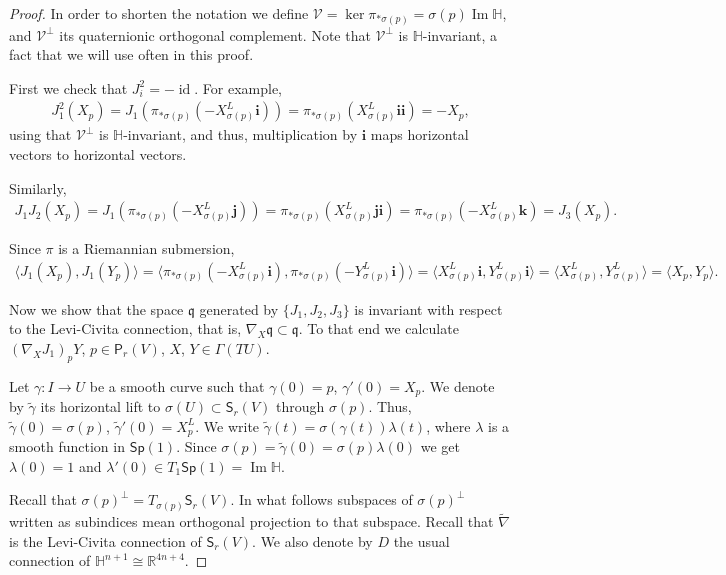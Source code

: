 \documentclass[12pt, a4paper]{amsart}
\newcommand{\id}{\operatorname{id}}
\newcommand{\g}{\mathfrak}
\newcommand{\R}{\mathbb{R}}
\renewcommand{\H}{\mathbb{H}}
\renewcommand{\Im}{\operatorname{Im}}
\newcommand{\Sp}{\mathsf{Sp}}
\theoremstyle{remark}
\begin{document}
\begin{proof}
In order to shorten the notation we define $\mathcal{V}=\ker\pi_{*\sigma(p)}=\sigma(p)\Im\H$, and $\mathcal{V}^\perp$ its quaternionic orthogonal complement.
Note that ${\mathcal{V}}^\perp$ is $\H$-invariant, a fact that we will use often in this proof.

First we check that $J_i^2=-\id$.
For example, 
\[
\begin{aligned}
J_1^2(X_p)
=J_1(\pi_{*\sigma(p)}(-X_{\sigma(p)}^L\mathbf{i}))
=\pi_{*\sigma(p)}(X_{\sigma(p)}^L\mathbf{i}\mathbf{i})
=-X_p,
\end{aligned}
\]
using that $\mathcal{V}^\perp$ is $\H$-invariant, and thus, multiplication by $\mathbf{i}$ maps horizontal vectors to horizontal vectors.

Similarly,
\[
\begin{aligned}
J_1 J_2(X_p)
=J_1(\pi_{*\sigma(p)}(-X_{\sigma(p)}^L\mathbf{j}))
=\pi_{*\sigma(p)}(X_{\sigma(p)}^L\mathbf{j}\mathbf{i})
=\pi_{*\sigma(p)}(-X_{\sigma(p)}^L\mathbf{k})
=J_3(X_p).
\end{aligned}
\]

Since $\pi$ is a Riemannian submersion,
\[
\begin{aligned}
\langle J_1(X_p),J_1(Y_p)\rangle
=\langle \pi_{*\sigma(p)}(-X_{\sigma(p)}^L\mathbf{i}),\pi_{*\sigma(p)}(-Y_{\sigma(p)}^L\mathbf{i})\rangle
=\langle X_{\sigma(p)}^L\mathbf{i}, Y_{\sigma(p)}^L\mathbf{i}\rangle
=\langle X_{\sigma(p)}^L, Y_{\sigma(p)}^L\rangle
=\langle X_p,Y_p\rangle.
\end{aligned}
\]

Now we show that the space $\g{q}$ generated by $\{J_1,J_2,J_3\}$ is invariant with respect to the Levi-Civita connection, that is, $\nabla_X\g{q}\subset\g{q}$.
To that end we calculate $(\nabla_X J_1)_p Y$, $p\in \mathsf{P}_r(V)$, $X$, $Y\in\Gamma(TU)$.

Let $\gamma\colon I\to U$ be a smooth curve such that $\gamma(0)=p$, $\gamma'(0)=X_p$.
We denote by $\tilde{\gamma}$ its horizontal lift to $\sigma(U)\subset\mathsf{S}_r(V)$ through $\sigma(p)$.
Thus, $\tilde{\gamma}(0)=\sigma(p)$, $\tilde{\gamma}'(0)=X_p^L$.
We write $\tilde{\gamma}(t)=\sigma(\gamma(t))\lambda(t)$, where $\lambda$ is a smooth function in $\Sp(1)$.
Since $\sigma(p)=\tilde{\gamma}(0)=\sigma(p)\lambda(0)$ we get $\lambda(0)=1$ and $\lambda'(0)\in T_1\Sp(1)=\Im\H$.

Recall that $\sigma(p)^\perp=T_{\sigma(p)}\mathsf{S}_r(V)$. In what follows subspaces of $\sigma(p)^\perp$ written as subindices mean orthogonal projection to that subspace.
Recall that $\tilde{\nabla}$ is the Levi-Civita connection of $\mathsf{S}_r(V)$.
We also denote by $D$ the usual connection of $\H^{n+1}\cong\R^{4n+4}$.


\end{proof}
\end{document}
